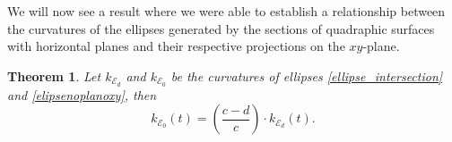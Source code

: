 \documentclass{amsart}
\theoremstyle{plain}
\newtheorem{theorem}{\bf Theorem}
\numberwithin{equation}{section}
\begin{document}

\vspace{0.5cm}

\begin{center}
	\centering
	\footnotesize
\end{center}

We will now see a result where we were able to establish a relationship between the curvatures of the ellipses generated by the sections of quadraphic surfaces with horizontal planes and their respective projections on the $xy$-plane.

\begin{theorem}\label{teorema3}
	Let $k_{\mathcal{E}_d}$ and $k_{\mathcal{E}_0}$ be the curvatures of ellipses \eqref{ellipse_intersection} and \eqref{elipsenoplanoxy}, then
	$$
	k_{\mathcal{E}_0}(t) =  \left(\dfrac{c-d}{c} \right) \cdot k_{\mathcal{E}_d}(t).
	$$
\end{theorem}
\end{document}
